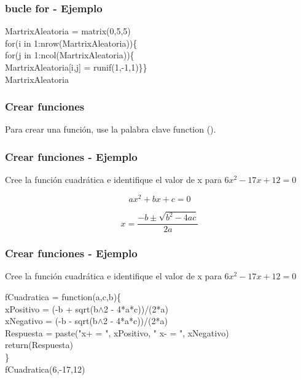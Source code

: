 \documentclass[11pt]{beamer}
\begin{document}
\begin{frame}
	\frametitle{bucle for - Ejemplo}
	MartrixAleatoria = matrix(0,5,5)\\
	
	
	for(i in 1:nrow(MartrixAleatoria))\{\\
		for(j in 1:ncol(MartrixAleatoria))\{\\
			MartrixAleatoria[i,j] = runif(1,-1,1)\}\}\\
	
	MartrixAleatoria
	
\end{frame}


\begin{frame}
	\frametitle{Crear funciones}
	
	Para crear una función, use la palabra clave function ().
	
\end{frame}

\begin{frame}
	\frametitle{Crear funciones - Ejemplo}
	
	Cree la función cuadrática e identifique el valor de x para $6x^{2}-17x+12=0$
	
	\begin{equation}
	ax^{2}+ bx + c=0
	\end{equation}
	
	\begin{equation}
	x =\frac{-b \pm \sqrt{b^{2}-4ac}}{2a}
	\end{equation}
	
\end{frame}

\begin{frame}
	\frametitle{Crear funciones - Ejemplo}
	
	Cree la función cuadrática e identifique el valor de x para $6x^{2}-17x+12=0$
	
	fCuadratica = function(a,c,b)\{ \\

		xPositivo = (-b + sqrt(b$\wedge$2 - 4*a*c))/(2*a)\\
		xNegativo = (-b - sqrt(b$\wedge$2 - 4*a*c))/(2*a)\\

		Respuesta = paste("x+ = ", xPositivo, " x- = ", xNegativo) \\
		return(Respuesta) \\
	\} \\
fCuadratica(6,-17,12)
	\end{frame}
\end{document}
